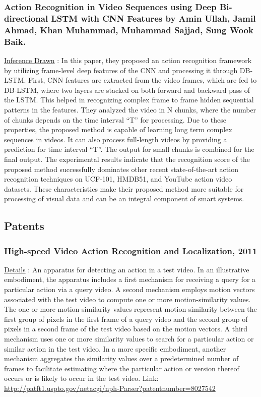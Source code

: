 \documentclass[12pt]{extarticle}
\begin{document}
\subsubsection{Action Recognition in Video Sequences using Deep Bi-directional LSTM with CNN Features by Amin Ullah, Jamil Ahmad, Khan Muhammad, Muhammad Sajjad, Sung Wook Baik.}
\underline{Inference Drawn} :
In this paper, they proposed an action recognition framework by utilizing frame-level deep features of the CNN and processing it through DB-LSTM. First, CNN features are extracted from the video frames, which are fed to DB-LSTM, where two layers are stacked on both forward and backward pass of the LSTM. This helped in recognizing complex frame to frame hidden sequential patterns in the features. They analyzed the video in N chunks, where the number of chunks depends on the time interval “T” for processing. Due to these properties, the proposed method is capable of learning long term complex sequences in videos. It can also process full-length videos by providing a prediction for time interval “T”. The output for small chunks is combined for the final output. The experimental results indicate that the recognition score of the proposed method successfully dominates other recent state-of-the-art action recognition techniques on UCF-101, HMDB51, and YouTube action video datasets. These characteristics make their proposed method more suitable for processing of visual data and can be an integral component of smart systems.

\subsection{Patents}

\subsubsection{High-speed Video Action Recognition and Localization, 2011}
\underline{Details} :
An apparatus for detecting an action in a test video. In an illustrative embodiment, the apparatus includes a first mechanism for receiving a query for a particular action via a query video. A second mechanism employs motion vectors associated with the test video to compute one or more motion-similarity values. The one or more motion-similarity values represent motion similarity between the first group of pixels in the first frame of a query video and the second group of pixels in a second frame of the test video based on the motion vectors. A third mechanism uses one or more similarity values to search for a particular action or similar action in the test video. In a more specific embodiment, another mechanism aggregates the similarity values over a predetermined number of frames to facilitate estimating where the particular action or version thereof occurs or is likely to occur in the test video.
\newline
Link: \underline{http://patft1.uspto.gov/netacgi/nph-Parser?patentnumber=8027542}
\end{document}
